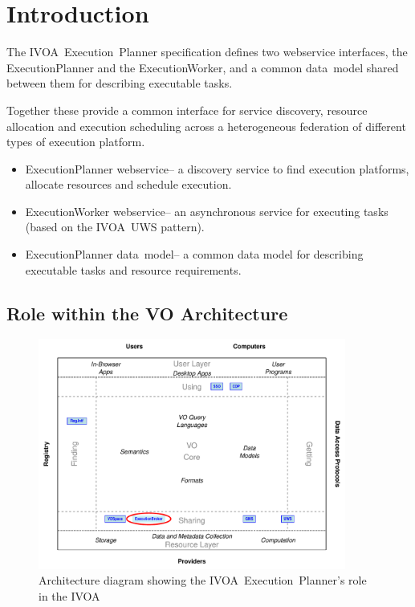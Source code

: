 \documentclass[11pt,a4paper]{ivoa}
\newcommand{\datamodel} {data~model\xspace}
\newcommand{\webservice} {webservice\xspace}
\newcommand{\ivoa} {IVOA\xspace}
\newcommand{\ivoauws} {IVOA~UWS\xspace}
\newcommand{\execplanner} {ExecutionPlanner\xspace}
\newcommand{\execworker} {ExecutionWorker\xspace}
\newcommand{\ivoaexecplanner} {IVOA~Execution~Planner\xspace}
\begin{document}
\section{Introduction}
\label{sec:introduction}

The \ivoaexecplanner specification defines two \webservice interfaces, the \execplanner and the \execworker,
and a common \datamodel shared between them for describing executable tasks.

Together these provide a common interface for service discovery, resource allocation and execution scheduling
across a heterogeneous federation of different types of execution platform.

\begin{itemize}
    \item \execplanner \webservice – a discovery service to find execution platforms, allocate resources and schedule execution.
    \item \execworker \webservice – an asynchronous service for executing tasks (based on the \ivoauws pattern).
    \item \execplanner \datamodel – a common data model for describing executable tasks and resource requirements.
\end{itemize}

\subsection{Role within the VO Architecture}
\label{subsec:ivoarole}

\begin{figure}
\centering
\includegraphics[width=0.9\textwidth]{role_diagram.pdf}
\caption{Architecture diagram showing the \ivoaexecplanner{}'s role in the \ivoa}
\label{fig:archdiag}
\end{figure}
\end{document}
